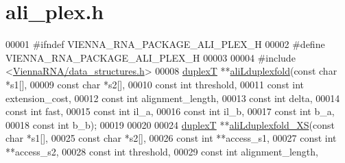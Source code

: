 \hypertarget{ali__plex_8h_source}{}\section{ali\+\_\+plex.\+h}
\label{ali__plex_8h_source}

\begin{DoxyCode}
00001 \textcolor{preprocessor}{#ifndef VIENNA\_RNA\_PACKAGE\_ALI\_PLEX\_H}
00002 \textcolor{preprocessor}{#define VIENNA\_RNA\_PACKAGE\_ALI\_PLEX\_H}
00003 
00004 \textcolor{preprocessor}{#include <\mbox{\hyperlink{data__structures_8h}{ViennaRNA/data\_structures.h}}>}
00008 \mbox{\hyperlink{group__data__structures_structduplex_t}{duplexT}} **\mbox{\hyperlink{ali__plex_8h_ac7c960b1d866da6eb8d1a3297ae1a2dd}{aliLduplexfold}}(\textcolor{keyword}{const} \textcolor{keywordtype}{char} *s1[],
00009                          \textcolor{keyword}{const} \textcolor{keywordtype}{char} *s2[],
00010                          \textcolor{keyword}{const} \textcolor{keywordtype}{int}  threshold,
00011                          \textcolor{keyword}{const} \textcolor{keywordtype}{int}  extension\_cost,
00012                          \textcolor{keyword}{const} \textcolor{keywordtype}{int}  alignment\_length,
00013                          \textcolor{keyword}{const} \textcolor{keywordtype}{int}  delta,
00014                          \textcolor{keyword}{const} \textcolor{keywordtype}{int}  fast,
00015                          \textcolor{keyword}{const} \textcolor{keywordtype}{int}  il\_a,
00016                          \textcolor{keyword}{const} \textcolor{keywordtype}{int}  il\_b,
00017                          \textcolor{keyword}{const} \textcolor{keywordtype}{int}  b\_a,
00018                          \textcolor{keyword}{const} \textcolor{keywordtype}{int}  b\_b);
00019 
00020 
00024 \mbox{\hyperlink{group__data__structures_structduplex_t}{duplexT}} **\mbox{\hyperlink{ali__plex_8h_a9953709a629897d8b52bd13c7c87a0c6}{aliLduplexfold\_XS}}(\textcolor{keyword}{const} \textcolor{keywordtype}{char}  *s1[],
00025                             \textcolor{keyword}{const} \textcolor{keywordtype}{char}  *s2[],
00026                             \textcolor{keyword}{const} \textcolor{keywordtype}{int}   **access\_s1,
00027                             \textcolor{keyword}{const} \textcolor{keywordtype}{int}   **access\_s2,
00028                             \textcolor{keyword}{const} \textcolor{keywordtype}{int}   threshold,
00029                             \textcolor{keyword}{const} \textcolor{keywordtype}{int}   alignment\_length,

\end{DoxyCode}
